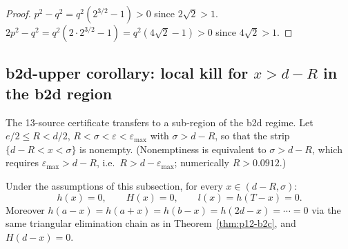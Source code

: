 \begin{proof}
$p^{2} - q^{2} = q^{2}(2^{3/2} - 1) > 0$ since $2\sqrt{2} > 1$.
$2p^{2} - q^{2} = q^{2}(2 \cdot 2^{3/2} - 1) = q^{2}(4\sqrt{2} - 1)
> 0$ since $4\sqrt{2} > 1$.
\end{proof}

\subsection{b2d-upper corollary: local kill for $x > d - R$ in the b2d region}
\label{sec:p12-b2d-upper}

The 13-source certificate transfers to a sub-region of the b2d
regime.  Let $e/2 \le R < d/2$, $R < \sigma < \varepsilon <
\varepsilon_{\max}$ with $\sigma > d - R$, so that the strip
$\{d - R < x < \sigma\}$ is nonempty.  (Nonemptiness is equivalent
to $\sigma > d - R$, which requires $\varepsilon_{\max} > d - R$,
i.e.\ $R > d - \varepsilon_{\max}$; numerically $R > 0.0912$.)

\begin{corollary}
\label{cor:p12-b2d-upper-local}
Under the assumptions of this subsection, for every
$x \in (d - R, \sigma)$:
$$h(x) = 0, \qquad H(x) = 0, \qquad l(x) = h(T - x) = 0.$$
Moreover $h(a - x) = h(a + x) = h(b - x) = h(2d - x) = \cdots = 0$
via the same triangular elimination chain as in
Theorem~\ref{thm:p12-b2c}, and $H(d - x) = 0$.
\end{corollary}

